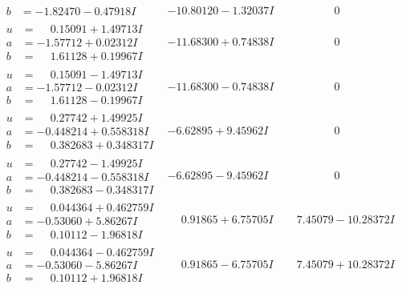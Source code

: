 \documentclass[1p]{elsarticle_modified}
\theoremstyle{definition}
\begin{document}
$$\begin{array}{c|c|c}
\begin{aligned}
b &= -1.82470 - 0.47918 I\end{aligned}
 & -10.80120 - 1.32037 I & \phantom{-0.000000 } 0 \\ \hline\begin{aligned}
u &= \phantom{-}0.15091 + 1.49713 I \\
a &= -1.57712 + 0.02312 I \\
b &= \phantom{-}1.61128 + 0.19967 I\end{aligned}
 & -11.68300 + 0.74838 I & \phantom{-0.000000 } 0 \\ \hline\begin{aligned}
u &= \phantom{-}0.15091 - 1.49713 I \\
a &= -1.57712 - 0.02312 I \\
b &= \phantom{-}1.61128 - 0.19967 I\end{aligned}
 & -11.68300 - 0.74838 I & \phantom{-0.000000 } 0 \\ \hline\begin{aligned}
u &= \phantom{-}0.27742 + 1.49925 I \\
a &= -0.448214 + 0.558318 I \\
b &= \phantom{-}0.382683 + 0.348317 I\end{aligned}
 & -6.62895 + 9.45962 I & \phantom{-0.000000 } 0 \\ \hline\begin{aligned}
u &= \phantom{-}0.27742 - 1.49925 I \\
a &= -0.448214 - 0.558318 I \\
b &= \phantom{-}0.382683 - 0.348317 I\end{aligned}
 & -6.62895 - 9.45962 I & \phantom{-0.000000 } 0 \\ \hline\begin{aligned}
u &= \phantom{-}0.044364 + 0.462759 I \\
a &= -0.53060 + 5.86267 I \\
b &= \phantom{-}0.10112 - 1.96818 I\end{aligned}
 & \phantom{-}0.91865 + 6.75705 I & \phantom{-}7.45079 - 10.28372 I \\ \hline\begin{aligned}
u &= \phantom{-}0.044364 - 0.462759 I \\
a &= -0.53060 - 5.86267 I \\
b &= \phantom{-}0.10112 + 1.96818 I\end{aligned}
 & \phantom{-}0.91865 - 6.75705 I & \phantom{-}7.45079 + 10.28372 I \\ \hline\begin{aligned}

\end{aligned}
\end{array}$$
\end{document}
